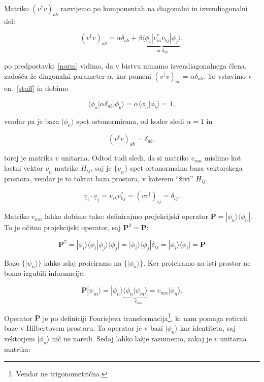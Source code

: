 \documentclass[a4 paper, 12pt]{article}
\begin{document}
Matriko $(v^\dagger v)_{ab}$ razvijemo po komponentah na diagonalni in izvendiagonalni del:

\begin{equation*}
	(v^\dagger v)_{ab} = \alpha\delta_{ab} +
		\beta\underbrace{\langle\phi_i| v^*_{ia}v_{bj} |\phi_j\rangle}_{=\delta_{ab}},
\end{equation*}

po predpostavki~\eqref{norm} vidimo, da v bistvu nimamo izvendiagonalnega člena, zadošča že
diagonalni parameter $\alpha$, kar pomeni $(v^\dagger v)_{ab} = \alpha \delta_{ab}$. To
vstavimo v en.~\eqref{stuff} in dobimo

\begin{equation*}
	\langle\phi_a|\alpha\delta_{ab}|\phi_b\rangle = \alpha\langle\phi_a|\phi_b\rangle = 1,
\end{equation*}

vendar pa je baza ${|\phi_n\rangle}$ spet ortonormirana, od koder sledi $\alpha = 1$ in

\begin{equation}
	(v^\dagger v)_{ab} = \delta_{ab},
\end{equation}

torej je matrika $v$ unitarna. Odtod tudi sledi, da si matriko $v_{nm}$ mislimo kot lastni
vektor $\underline{v}_n$ matrike $H_{ij}$, saj je $\{\underline{v}_n\}$ spet
ortonormalna baza vektorskega prostora, vendar je to tokrat baza prostora, v katerem "`živi"'
$H_{ij}$. 

\[
	\underline{v}_i \cdot \underline{v}_j = v_{ik} v_{kj}^* = (vv^\dagger)_{ij} = \delta_{ij}.
\]

Matriko $v_{mn}$ lahko dobimo tako: definirajmo projekcijski operator
$\mathbf{P} = |\phi_n\rangle\langle\phi_n|$. To je očitno projekcijski operator, saj
$\mathbf{P}^2 = \mathbf{P}$:

\[
	\mathbf{P}^2 = |\phi_i\rangle\langle\phi_i|\phi_j\rangle\langle\phi_j| =
		|\phi_i\rangle\langle\phi_j|\delta_{ij} = |\phi_i\rangle\langle\phi_i| = 
		\mathbf{P}
\]

Bazo $\big\{|\psi_n\rangle\big\}$ lahko zdaj proiciramo na $\big\{|\phi_n\rangle\big\}$.
Ker proiciramo na isti prostor ne bomo izgubili informacije.

\[
	\mathbf{P}|\psi_m\rangle = |\phi_n\rangle\underbrace{\langle\phi_n|\psi_m\rangle}_{=
		v_{mn}} = v_{mn}|\phi_n\rangle.
\]

Operator $\mathbf{P}$ je po definiciji Fouriejeva transformacija\footnote{Vendar ne
trigonometrična.}, ki nam pomaga rotirati baze v Hilbertovem prostoru. Ta operator je v bazi
$|\phi_n\rangle$ kar identiteta, saj vektorjem $|\phi_n\rangle$ nič ne naredi. Sedaj lahko
lažje razumemo, zakaj je $v$ unitarna matrika:
\end{document}
